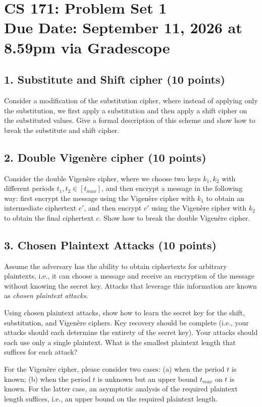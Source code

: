 \documentclass[11pt]{article}
\newcommand{\duedate}{September 11, 2026 at 8.59pm via Gradescope}
\begin{document}
\section*{CS 171: Problem Set 1\\ {\small Due Date: \duedate} }

\subsection*{1. Substitute and Shift cipher (10 points)}
Consider a modification of the substitution cipher, where instead of applying only the substitution, we first apply a substitution and then apply a shift cipher on the substituted values. Give a formal description of this scheme and show how to break the substitute and shift cipher.

\subsection*{2. Double Vigen\`{e}re cipher (10 points)}
Consider the double Vigen\`{e}re cipher, where we choose two keys $k_1, k_2$ with different periods $t_1,t_2 \in [t_{max}]$, and then encrypt a message in the following way: first encrypt the message using the Vigen\`{e}re cipher with $k_1$ to obtain an intermediate ciphertext $c'$, and then encrypt $c'$ using the Vigen\`{e}re cipher with $k_2$ to obtain the final ciphertext $c$.
Show how to break the double Vigen\`{e}re cipher.

\subsection*{3. Chosen Plaintext Attacks (10 points)}
Assume the adversary has the ability to obtain ciphertexts for arbitrary plaintexts, i.e., it can choose a message and receive an encryption of the message without knowing the secret key.
Attacks that leverage this information are known as \textit{chosen plaintext attacks}.
\medskip

\noindent Using chosen plaintext attacks, show how to learn the secret key for the shift, substitution, and Vigen\`{e}re ciphers. 
Key recovery should be complete (i.e., your attacks should each determine the entirety of the secret key). 
Your attacks should each use only a single plaintext. What is the smallest plaintext length that suffices for each attack? 
\medskip

\noindent For the Vigen\`{e}re cipher, please consider two cases: (a) when the period $t$ is known; (b) when the period $t$ is unknown but an upper bound $t_{max}$ on $t$ is known. For the latter case, an asymptotic analysis of the required plaintext length suffices, i.e., an upper bound on the required plaintext length.
\end{document}
